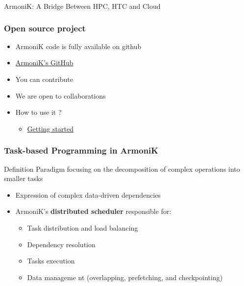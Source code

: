 \documentclass[10pt,aspectratio=1609]{beamer}
\begin{document}
\begin{section}{ArmoniK: A Bridge Between HPC, HTC and Cloud}
  \begin{frame}
    \frametitle{Open source project}
    \begin{itemize}
      \item ArmoniK code is fully available on github
      \item \href{https://github.com/aneoconsulting/ArmoniK}{ArmoniK's GitHub}
      \item You can contribute
      \item We are open to collaborations
      \item How to use it ?
      \begin{itemize}
        \item \href{https://armonik.readthedocs.io/en/latest/content/armonik/getting-started.html}{Getting started}
      \end{itemize}
    \end{itemize}
  \end{frame}

  \begin{frame}
    \frametitle{Task-based Programming in ArmoniK}
    \begin{block}{Definition}
      Paradigm focusing on the decomposition of complex operations into smaller tasks
    \end{block}
    \begin{itemize}
      \item Expression of complex data-driven dependencies
      \item ArmoniK's \textbf{distributed scheduler} responsible for:
      \begin{itemize}
        \item Task distribution and load balancing
        \item Dependency resolution
        \item Tasks execution
        \item Data manageme nt (overlapping, prefetching, and checkpointing)
      \end{itemize}
    \end{itemize}
    \footnotesize
    
  \end{frame}


\end{section}
\end{document}
